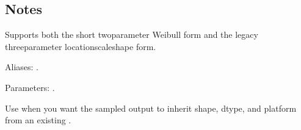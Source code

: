 \documentclass[letterpaper,10pt,english]{sphinxmanual}
\begin{document}
\begin{sphinxVerbatim}[commandchars=\\\{\}]
\end{sphinxVerbatim}


\subsection{Notes}
\label{\detokenize{distribution_catalog:id143}}
\sphinxAtStartPar
Supports both the short two\sphinxhyphen{}parameter Weibull form and the legacy three\sphinxhyphen{}parameter location\sphinxhyphen{}scale\sphinxhyphen{}shape form.

\sphinxAtStartPar
Aliases: .

\sphinxAtStartPar
Parameters: .

\sphinxAtStartPar
Use  when you want the sampled output to inherit shape, dtype, and platform from an existing .
\end{document}
